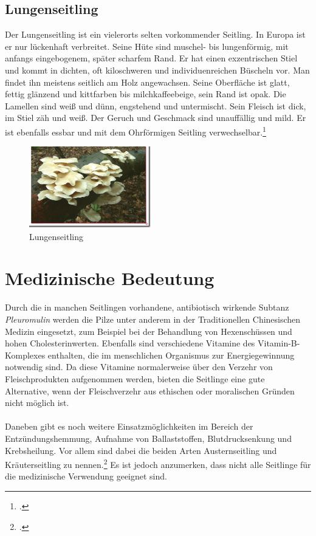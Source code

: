\documentclass[a4paper,abstracton]{scrreprt}
\begin{document}
\subsection{Lungenseitling}
Der Lungenseitling ist ein vielerorts selten vorkommender Seitling. In Europa ist er nur lückenhaft verbreitet. Seine Hüte sind muschel- bis lungenförmig, mit anfangs eingebogenem, später scharfem Rand. Er hat einen exzentrischen Stiel und kommt in dichten, oft kiloschweren und individuenreichen Büscheln vor. Man findet ihn meistens seitlich am Holz angewachsen. Seine Oberfläche ist glatt, fettig glänzend und kittfarben bis milchkaffeebeige, sein Rand ist opak. Die Lamellen sind weiß und dünn, engstehend und untermischt. Sein Fleisch ist dick, im Stiel zäh und weiß. Der Geruch und Geschmack sind unauffällig und mild. Er ist ebenfalls essbar und mit dem Ohrförmigen Seitling verwechselbar.\footcite{tintling_berindet}

\begin{figure}[H]
\centering
\includegraphics[width=200px]{lungenseitling}
\caption[Lungenseitling]{Lungenseitling\protect\footnotemark}
\label{fig:lungenseitling}
\end{figure}


\section{Medizinische Bedeutung}
Durch die in manchen Seitlingen vorhandene, antibiotisch wirkende Subtanz \emph{Pleuromulin} werden die Pilze unter anderem in der Traditionellen Chinesischen Medizin eingesetzt, zum Beispiel bei der Behandlung von Hexenschüssen und hohen Cholesterinwerten. Ebenfalls sind verschiedene Vitamine des Vitamin-B-Komplexes enthalten, die im menschlichen Organismus zur Energiegewinnung notwendig sind. Da diese Vitamine normalerweise über den Verzehr von Fleischprodukten aufgenommen werden, bieten die Seitlinge eine gute Alternative, wenn der Fleischverzehr aus ethischen oder moralischen Gründen nicht möglich ist.\\
\\Daneben gibt es noch weitere Einsatzmöglichkeiten im Bereich der Entzündungshemmung, Aufnahme von Ballaststoffen, Blutdrucksenkung und Krebsheilung.
Vor allem sind dabei die beiden Arten Austernseitling und Kräuterseitling zu nennen.\footcite{vital} Es ist jedoch anzumerken, dass nicht alle Seitlinge für die medizinische Verwendung geeignet sind.
\end{document}

